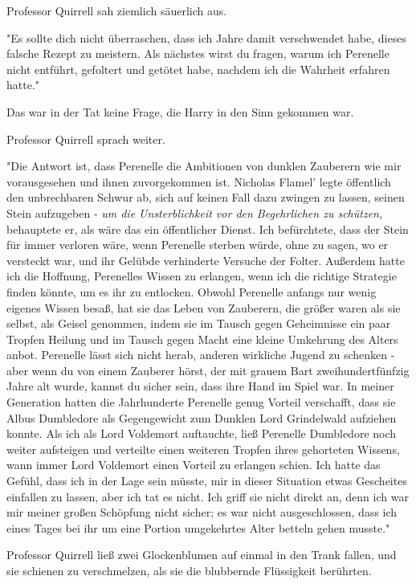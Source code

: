 {Professor Quirrell sah ziemlich säuerlich aus.

"Es sollte dich nicht überraschen, dass ich Jahre damit verschwendet habe, dieses falsche Rezept zu meistern. Als nächstes wirst du fragen, warum ich Perenelle nicht entführt, gefoltert und getötet habe, nachdem ich die Wahrheit erfahren hatte."

Das war in der Tat keine Frage, die Harry in den Sinn gekommen war.

Professor Quirrell sprach weiter.

"Die Antwort ist, dass Perenelle die Ambitionen von dunklen Zauberern wie mir vorausgesehen und ihnen zuvorgekommen ist. Nicholas Flamel' legte öffentlich den unbrechbaren Schwur ab, sich auf keinen Fall dazu zwingen zu lassen, seinen Stein aufzugeben - \emph{um die Unsterblichkeit vor den Begehrlichen zu schützen,} behauptete er, als wäre das ein öffentlicher Dienst. Ich befürchtete, dass der Stein für immer verloren wäre, wenn Perenelle sterben würde, ohne zu sagen, wo er versteckt war, und ihr Gelübde verhinderte Versuche der Folter. Außerdem hatte ich die Hoffnung, Perenelles Wissen zu erlangen, wenn ich die richtige Strategie finden könnte, um es ihr zu entlocken. Obwohl Perenelle anfangs nur wenig eigenes Wissen besaß, hat sie das Leben von Zauberern, die größer waren als sie selbst, als Geisel genommen, indem sie im Tausch gegen Geheimnisse ein paar Tropfen Heilung und im Tausch gegen Macht eine kleine Umkehrung des Alters anbot. Perenelle lässt sich nicht herab, anderen wirkliche Jugend zu schenken - aber wenn du von einem Zauberer hörst, der mit grauem Bart zweihundertfünfzig Jahre alt wurde, kannst du sicher sein, dass ihre Hand im Spiel war. In meiner Generation hatten die Jahrhunderte Perenelle genug Vorteil verschafft, dass sie Albus Dumbledore als Gegengewicht zum Dunklen Lord Grindelwald aufziehen konnte. Als ich als Lord Voldemort auftauchte, ließ Perenelle Dumbledore noch weiter aufsteigen und verteilte einen weiteren Tropfen ihres gehorteten Wissens, wann immer Lord Voldemort einen Vorteil zu erlangen schien. Ich hatte das Gefühl, dass ich in der Lage sein müsste, mir in dieser Situation etwas Gescheites einfallen zu lassen, aber ich tat es nicht. Ich griff sie nicht direkt an, denn ich war mir meiner großen Schöpfung nicht sicher; es war nicht ausgeschlossen, dass ich eines Tages bei ihr um eine Portion umgekehrtes Alter betteln gehen musste."

Professor Quirrell ließ zwei Glockenblumen auf einmal in den Trank fallen, und sie schienen zu verschmelzen, als sie die blubbernde Flüssigkeit berührten.

}
